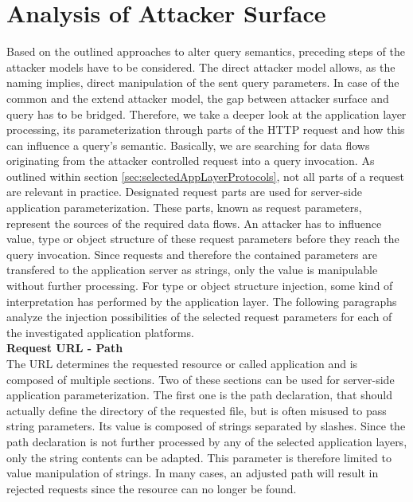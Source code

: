 \section{Analysis of Attacker Surface}
Based on the outlined approaches to alter query semantics, preceding steps of the attacker models have to be considered. The direct attacker model allows, as the naming implies, direct manipulation of the sent query parameters. In case of the common and the extend attacker model, the gap between attacker surface and query has to be bridged. Therefore, we take a deeper look at the application layer processing, its parameterization through parts of the HTTP request and how this can influence a query's semantic. Basically, we are searching for data flows originating from the attacker controlled request into a query invocation. As outlined within section \ref{sec:selectedAppLayerProtocols}, not all parts of a request are relevant in practice. Designated request parts are used for server-side application parameterization. These parts, known as request parameters, represent the sources of the required data flows. An attacker has to influence value, type or object structure of these request parameters before they reach the query invocation. Since requests and therefore the contained parameters are transfered to the application server as strings, only the value is manipulable without further processing. For type or object structure injection, some kind of interpretation has performed by the application layer. The following paragraphs analyze the injection possibilities of the selected request parameters for each of the investigated application platforms. \\

\textbf{Request URL - Path}\\
The URL determines the requested resource or called application and is composed of multiple sections. Two of these sections can be used for server-side application parameterization. The first one is the path declaration, that should actually define the directory of the requested file, but is often misused to pass string parameters. Its value is composed of strings separated by slashes. Since the path declaration is not further processed by any of the selected application layers, only the string contents can be adapted. This parameter is therefore limited to value manipulation of strings. In many cases, an adjusted path will result in rejected requests since the resource can no longer be found.\\ 


